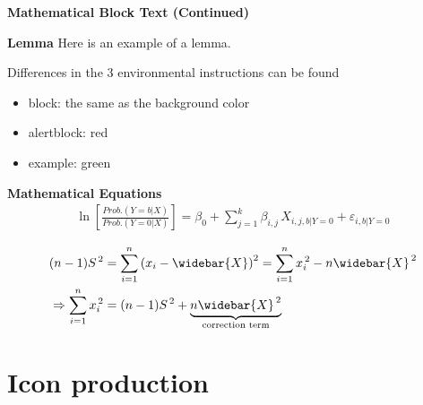 \documentclass[12pt, aspectratio=169]{beamer}
\begin{document}

\linespread{1} 
\begin{frame}{\textbf{Mathematical Block Text (Continued)}}
\linespread{1.5} 

	\begin{alertblock}{\textbf{Lemma}}
		Here is an example of a lemma.
	\end{alertblock}
	\label{Linked_text} 

	\begin{example}
		Differences in the 3 environmental instructions can be found
		\begin{itemize}
			\item block: the same as the background color
			\item alertblock: red
			\item example: green
		\end{itemize}
	\end{example}
\end{frame}


\linespread{1} 
\begin{frame}[<+>]{\textbf{Mathematical Equations}}
\linespread{1.5} 
	\begin{align}\label{reg}
		\ln\left[\frac{Prob.\left(Y=b|X\right)}{Prob.\left(Y=0|X\right)}\right]
			=\beta_0+\sum_{j=1}^k \beta_{i,j}\,X_{i,j,b|Y=0}+\varepsilon_{i,b|Y=0}
	\end{align}

	\begin{align}\label{var}
		\left(n-1\right)\!S^{\,2} & =  \sum_{i=1}^{n}\left(x_{i}-\widebar{X}\right)^{2} 
			 =  \sum_{i=1}^{n}x_i^{\,2}-n\widebar{X}^{\,2} \notag \\
		\Rightarrow \sum_{i=1}^{n} x_i^{\,2} & =  \left(n-1\right)\!S^{\,2}+\underbrace{n \widebar{X}^{\,2}}_{\text{correction term}}
	\end{align}

\end{frame}

\section{Icon production}

\end{document}
